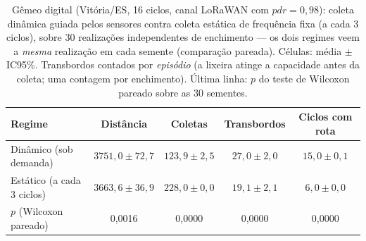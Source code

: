 \begin{table}[H]
\centering
\caption{Gêmeo digital (Vitória/ES, 16 ciclos, canal LoRaWAN com $\mathit{pdr}=0{,}98$): coleta dinâmica guiada pelos sensores contra coleta estática de frequência fixa (a cada 3 ciclos), sobre 30 realizações independentes de enchimento --- os dois regimes veem a \emph{mesma} realização em cada semente (comparação pareada). Células: média $\pm$ IC95\%. Transbordos contados por \emph{episódio} (a lixeira atinge a capacidade antes da coleta; uma contagem por enchimento). Última linha: $p$ do teste de Wilcoxon pareado sobre as 30 sementes.}\label{tab:twin}
\begin{tabular}{lcccc}
\toprule
\textbf{Regime} & \textbf{Distância} & \textbf{Coletas} & \textbf{Transbordos} & \textbf{Ciclos com rota} \\
\midrule
Dinâmico (sob demanda) & $3751{,}0 \pm 72{,}7$ & $123{,}9 \pm 2{,}5$ & $27{,}0 \pm 2{,}0$ & $15{,}0 \pm 0{,}1$ \\
Estático (a cada 3 ciclos) & $3663{,}6 \pm 36{,}9$ & $228{,}0 \pm 0{,}0$ & $19{,}1 \pm 2{,}1$ & $6{,}0 \pm 0{,}0$ \\
\midrule
$p$ (Wilcoxon pareado) & 0{,}0016 & 0{,}0000 & 0{,}0000 & 0{,}0000 \\
\bottomrule
\end{tabular}
\end{table}
